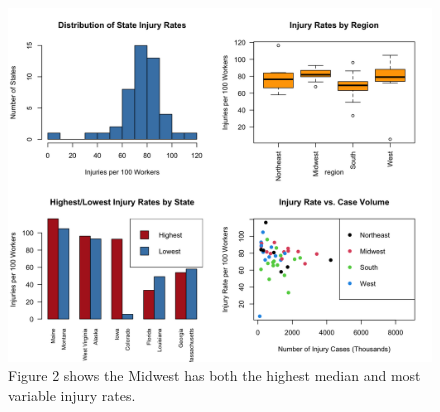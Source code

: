 \documentclass[
  letterpaper,
  DIV=11,
  numbers=noendperiod]{scrreprt}
\begin{document}
\begin{figure}[H]

{\centering \includegraphics[width=5.72917in,height=\textheight,keepaspectratio]{statecompare.png}

}

\caption{Figure 2 shows the Midwest has both the highest median and most
variable injury rates.}

\end{figure}%
\end{document}
